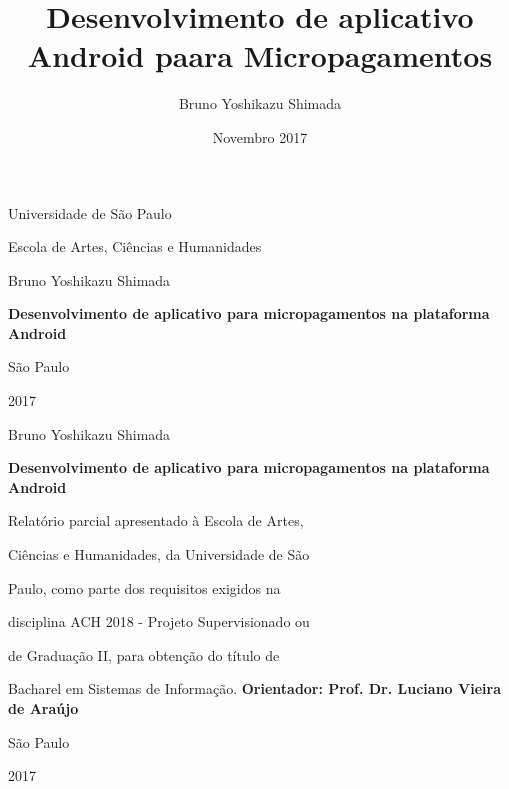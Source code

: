 \documentclass[hidelinks,12pt]{article}
\author{Bruno Yoshikazu Shimada}
\title{\textbf{Desenvolvimento de aplicativo Android paara Micropagamentos}
	}
\date{Novembro 2017}
\begin{document}
\begin{titlepage}
	\centering
	{\Large Universidade de S\~ao Paulo\par}
	{\Large Escola de Artes, Ci\^encias e Humanidades\par}
	\vfill
	{\Large Bruno Yoshikazu Shimada\par}
	\vspace{1cm}
	{\Large\bfseries Desenvolvimento de aplicativo para micropagamentos na plataforma Android\par}
	\vfill
	{\Large S\~ao Paulo\par}
	{\Large 2017\par}
\end{titlepage}
\newpage
\begin{titlepage}
	\centering
	{\Large Bruno Yoshikazu Shimada\par}
	\vspace{2cm}
	{\Large\bfseries Desenvolvimento de aplicativo para micropagamentos na plataforma Android\par}
	\vfill
	\begin{flushright}
		\hspace{7cm}Relat\'orio parcial apresentado \`a Escola de Artes,
	
		\hspace{7cm}Ci\^encias e Humanidades, da Universidade de S\~ao
	
		\hspace{7cm}Paulo, como parte dos requisitos exigidos na
	
		\hspace{7cm}disciplina ACH 2018 - Projeto Supervisionado ou
	
		\hspace{7cm}de Gradua\c{c}\~ao II, para obten\c{c}\~ao do t\'itulo de
	
		\hspace{7cm}Bacharel em Sistemas de Informa\c{c}\~ao.
		\bfseries Orientador: Prof. Dr. Luciano Vieira de Ara\'ujo
	\end{flushright}
	\vspace{2cm}
	{\Large S\~ao Paulo\par}
	{\Large 2017\par}
\end{titlepage}
\newpage
\end{document}
